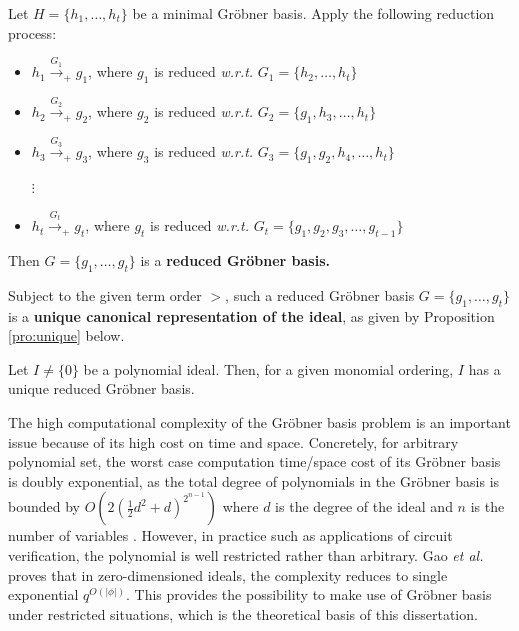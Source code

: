 \begin{Definition}
Let $H = \{h_1, \ldots, h_t\}$ be a minimal Gr\"obner basis.  Apply
the following reduction process: 
\begin{itemize}
\item $h_1 \stackrel{G_1}{\textstyle\longrightarrow}_+ g_1$, where
  $g_1$ is reduced {\it w.r.t.} $G_1 = \{h_2, \ldots, h_t\}$

\item $h_2 \stackrel{G_2}{\textstyle\longrightarrow}_+ g_2$, where
  $g_2$ is reduced {\it w.r.t.} $G_2 = \{g_1, h_3, \ldots, h_t\}$
\item $h_3 \stackrel{G_3}{\textstyle\longrightarrow}_+ g_3$, where
  $g_3$ is reduced {\it w.r.t.} $G_3 = \{g_1, g_2, h_4, \ldots, h_t\}$

\hspace{0.25in} $\vdots$
\vspace{0.1in}
\item $h_t \stackrel{G_t}{\textstyle\longrightarrow}_+ g_t$, where
  $g_t$ is reduced {\it w.r.t.} $G_t = \{g_1, g_2, g_3, \ldots, g_{t-1}\}$
\end{itemize}
Then $G = \{g_1, \ldots, g_t\}$ is a {\bf reduced Gr\"obner basis.}
\end{Definition}


Subject to the given term order $>$, such a reduced Gr\"obner
  basis $G = \{g_1, \dots, g_t\}$ is a {\bf unique canonical
    representation of the ideal}, as 
given by Proposition \ref{pro:unique} below.


\begin{Proposition}\label{pro:unique} \cite{gb_book} 
Let $I \neq \{0\}$ be a polynomial ideal. Then, for a given monomial ordering, $I$ has a unique reduced Gr\"obner basis.
\end{Proposition}


The high computational complexity of the Gr\"obner basis problem is an important issue
because of its high cost on time and space. Concretely, for arbitrary polynomial set, 
the worst case computation time/space cost of its Gr\"obner basis is doubly exponential, as the total degree of 
polynomials in the Gr\"obner basis is bounded by 
$O(2(\frac{1}{2}d^2+d)^{2^{n-1}})$ where $d$ is the degree of the ideal and $n$ is the number of variables
\cite{dube1986complexity}. However, in practice such as applications of circuit verification, 
the polynomial is well restricted rather than arbitrary.
Gao {\it et al.} \cite{gao:qe-gf-gb} proves that in zero-dimensioned ideals, the complexity reduces to single exponential $q^{O(|\phi|)}$.
This provides the possibility to make use of Gr\"obner basis under restricted situations,
which is the theoretical basis of this dissertation.

